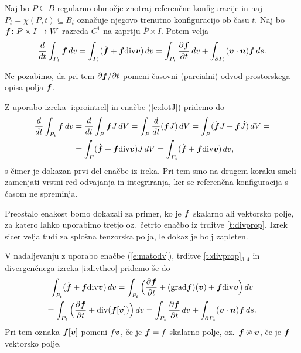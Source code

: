 \begin{izrek} \label{i:transport}
	Naj bo $P\subseteq B$ regularno območje znotraj referenčne konfiguracije in naj
	$P_t=\chi(P,t)\subseteq B_t$ označuje njegovo trenutno konfiguracijo ob času $t$.
	Naj bo $\boldsymbol f\colon P\times I\to W$ razreda $C^1$ na zaprtju $\overline{P}\times I$.
	Potem velja
	\begin{equation*}
		\frac{d}{dt}\int_{P_t}\boldsymbol f\,dv =
		\int_{P_t}(\dot{\boldsymbol f}+\boldsymbol f\mathrm{div}\boldsymbol v)\,dv=
		\int_{P_t}\frac{\partial\boldsymbol f}{\partial t}\,dv +
		\int_{\partial P_t}(\boldsymbol v\cdot\boldsymbol n)\boldsymbol f\,ds.
	\end{equation*}
\end{izrek}
Ne pozabimo, da pri tem $\partial\boldsymbol f/\partial t$ pomeni časovni (parcialni)
odvod prostorskega opisa polja $\boldsymbol f$.

\proof
	Z uporabo izreka \ref{i:prointrel} in enačbe (\ref{e:dotJ}) pridemo do
	\begin{align*}
		\frac{d}{dt}\int_{P_t}\boldsymbol f\,dv &= \frac{d}{dt}\int_{P}\boldsymbol fJ\,dV =
		\int_{P}\frac{d}{dt}(\boldsymbol fJ)\,dV = \int_{P}(\dot{\boldsymbol f}J+\boldsymbol f\dot{J})\,dV =\\
		&=\int_{P}(\dot{\boldsymbol f}+\boldsymbol f\mathrm{div}\boldsymbol v)J\,dV = \int_{P_t}(\dot{\boldsymbol f}+\boldsymbol f\mathrm{div}\boldsymbol v)\,dv,
	\end{align*}
	s čimer je dokazan prvi del enačbe iz ireka.
	Pri tem smo na drugem koraku smeli zamenjati vrstni red odvajanja in integriranja,
	ker se referenčna konfiguracija s časom ne spreminja.
	
	Preostalo enakost bomo dokazali za primer, ko je $\boldsymbol f$ skalarno ali vektorsko
	polje, za katero lahko uporabimo tretjo oz.~četrto enačbo iz trditve \ref{t:divprop}.
	Izrek sicer velja tudi za splošna tenzorska polja, le dokaz je bolj zapleten.
	
	V nadaljevanju z uporabo enačbe (\ref{e:matodv}), trditve \ref{t:divprop}$_{3,4}$
	in divergenčnega izreka \ref{i:divtheo} pridemo še do
	\begin{multline*}
		\int_{P_t}(\dot{\boldsymbol f}+\boldsymbol f\mathrm{div}\boldsymbol v)\,dv
		=\int_{P_t}\Big(\frac{\partial\boldsymbol f}{\partial t}+
		(\mathrm{grad}\boldsymbol f)(\boldsymbol v)+\boldsymbol f\mathrm{div}\boldsymbol v\Big)\,dv \\
		=\int_{P_t}\Big(\frac{\partial\boldsymbol f}{\partial t}+\mathrm{div}(\boldsymbol f[\boldsymbol v])\Big)\,dv
		=\int_{P_t}\frac{\partial\boldsymbol f}{\partial t}\,dv+
		\int_{\partial P_t}(\boldsymbol v\cdot\boldsymbol n)\boldsymbol f\,ds.
	\end{multline*}
	Pri tem oznaka $\boldsymbol f[\boldsymbol v]$ pomeni $f\boldsymbol v$, če je $\boldsymbol f=f$ skalarno polje,
	oz.~$\boldsymbol f\otimes\boldsymbol v$, če je $\boldsymbol f$ vektorsko polje.
\endproof


